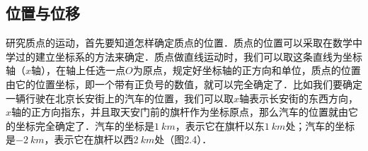 \begin{Project}
\section{位置与位移}

研究质点的运动，首先要知道怎样确定质点的位置．质点的位置可以采取在数学中学过的建立坐标系的方法来确定．质点做直线运动时，我们可以取这条直线为坐标轴（$x$轴），在轴上任选一点$O$为原点，规定好坐标轴的正方向和单位，质点的位置由它的位置坐标，即一个带有正负号的数值，就可以完全确定了．比如我们要确定一辆行驶在北京长安街上的汽车的位置，我们可以取$x$轴表示长安街的东西方向，$x$轴的正方向指东，并且取天安门前的旗杆作为坐标原点，那么汽车的位置就由它的坐标完全确定了．汽车的坐标是$\qty{1}{km}$，表示它在旗杆以东$\qty{1}{km}$处；汽车的坐标是$\qty{-2}{km}$，表示它在旗杆以西$\qty{2}{km}$处（图2.4）．
\begin{figure}[H]
    \centering
\end{figure}
\end{Project}
